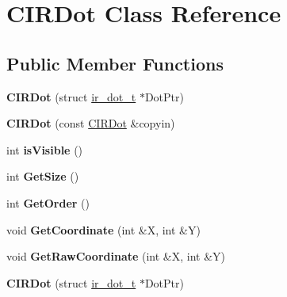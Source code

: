 \hypertarget{class_c_i_r_dot}{\section{C\-I\-R\-Dot Class Reference}
\label{class_c_i_r_dot}
}
\subsection*{Public Member Functions}
\begin{DoxyCompactItemize}
\item 
\hypertarget{class_c_i_r_dot_ae2b021d5fea77cea85cac86f4741a995}{{\bfseries C\-I\-R\-Dot} (struct \hyperlink{structir__dot__t}{ir\-\_\-dot\-\_\-t} $\ast$Dot\-Ptr)}\label{class_c_i_r_dot_ae2b021d5fea77cea85cac86f4741a995}

\item 
\hypertarget{class_c_i_r_dot_abed3b30052805bc25e54dacec11f35a8}{{\bfseries C\-I\-R\-Dot} (const \hyperlink{class_c_i_r_dot}{C\-I\-R\-Dot} \&copyin)}\label{class_c_i_r_dot_abed3b30052805bc25e54dacec11f35a8}

\item 
\hypertarget{class_c_i_r_dot_a52d88e14f8b1926faefb3c7ae3392a81}{int {\bfseries is\-Visible} ()}\label{class_c_i_r_dot_a52d88e14f8b1926faefb3c7ae3392a81}

\item 
\hypertarget{class_c_i_r_dot_a55d84ee46d123c4cee2d5972f3416674}{int {\bfseries Get\-Size} ()}\label{class_c_i_r_dot_a55d84ee46d123c4cee2d5972f3416674}

\item 
\hypertarget{class_c_i_r_dot_a820ce87be176b3d2cf15f27b7fe60ee3}{int {\bfseries Get\-Order} ()}\label{class_c_i_r_dot_a820ce87be176b3d2cf15f27b7fe60ee3}

\item 
\hypertarget{class_c_i_r_dot_a1eee8cc3c7dcdb20c0e73792386bb215}{void {\bfseries Get\-Coordinate} (int \&X, int \&Y)}\label{class_c_i_r_dot_a1eee8cc3c7dcdb20c0e73792386bb215}

\item 
\hypertarget{class_c_i_r_dot_aba4908bf9d66671639b8b767df162796}{void {\bfseries Get\-Raw\-Coordinate} (int \&X, int \&Y)}\label{class_c_i_r_dot_aba4908bf9d66671639b8b767df162796}

\item 
\hypertarget{class_c_i_r_dot_ae2b021d5fea77cea85cac86f4741a995}{{\bfseries C\-I\-R\-Dot} (struct \hyperlink{structir__dot__t}{ir\-\_\-dot\-\_\-t} $\ast$Dot\-Ptr)}\label{class_c_i_r_dot_ae2b021d5fea77cea85cac86f4741a995}


\end{DoxyCompactItemize}
